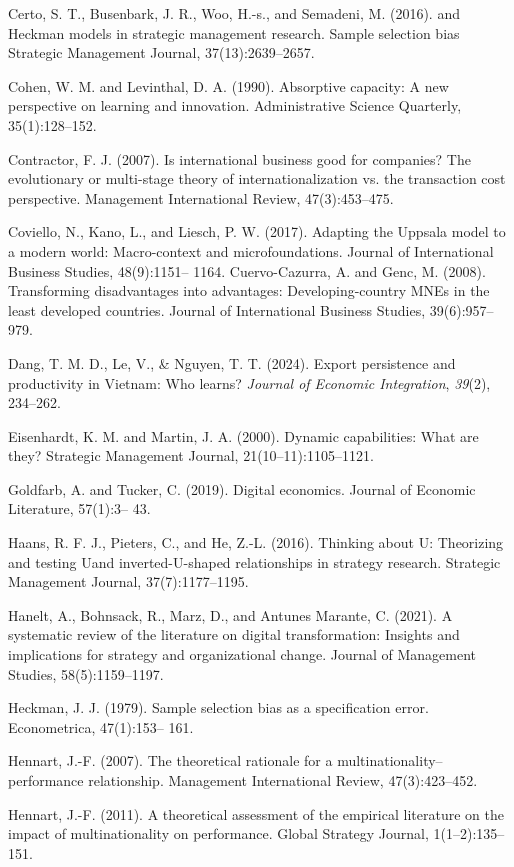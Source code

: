 \documentclass[12pt,a4paper]{article}
\begin{document}
Certo, S. T., Busenbark, J. R., Woo, H.-s., and Semadeni, M. (2016). and
Heckman models in strategic management research. Sample selection bias
Strategic Management Journal, 37(13):2639--2657.

Cohen, W. M. and Levinthal, D. A. (1990). Absorptive capacity: A new
perspective on learning and innovation. Administrative Science
Quarterly, 35(1):128--152.

Contractor, F. J. (2007). Is international business good for companies?
The evolutionary or multi-stage theory of internationalization vs. the
transaction cost perspective. Management International Review,
47(3):453--475.

Coviello, N., Kano, L., and Liesch, P. W. (2017). Adapting the Uppsala
model to a modern world: Macro-context and microfoundations. Journal of
International Business Studies, 48(9):1151-- 1164. Cuervo-Cazurra, A.
and Genc, M. (2008). Transforming disadvantages into advantages:
Developing-country MNEs in the least developed countries. Journal of
International Business Studies, 39(6):957--979.

Dang, T. M. D., Le, V., \& Nguyen, T. T. (2024). Export persistence and
productivity in Vietnam: Who learns? \emph{Journal of Economic
Integration}, \emph{39}(2), 234--262.

Eisenhardt, K. M. and Martin, J. A. (2000). Dynamic capabilities: What
are they? Strategic Management Journal, 21(10--11):1105--1121.

Goldfarb, A. and Tucker, C. (2019). Digital economics. Journal of
Economic Literature, 57(1):3-- 43.

Haans, R. F. J., Pieters, C., and He, Z.-L. (2016). Thinking about U:
Theorizing and testing Uand inverted-U-shaped relationships in strategy
research. Strategic Management Journal, 37(7):1177--1195.

Hanelt, A., Bohnsack, R., Marz, D., and Antunes Marante, C. (2021). A
systematic review of the literature on digital transformation: Insights
and implications for strategy and organizational change. Journal of
Management Studies, 58(5):1159--1197.

Heckman, J. J. (1979). Sample selection bias as a specification error.
Econometrica, 47(1):153-- 161.

Hennart, J.-F. (2007). The theoretical rationale for a
multinationality--performance relationship. Management International
Review, 47(3):423--452.

Hennart, J.-F. (2011). A theoretical assessment of the empirical
literature on the impact of multinationality on performance. Global
Strategy Journal, 1(1--2):135--151.
\end{document}
